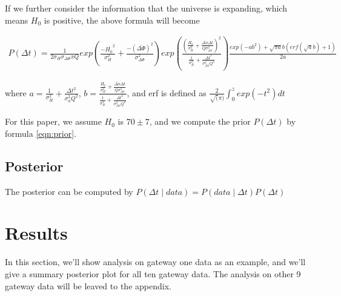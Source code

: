 \documentclass[\docopts]{\docclass}
\begin{document}
If we further consider the information that the universe is expanding, which means $H_0$ is positive, the above formula will become

\begin{align}
\label{eqn:prior}
P(\Delta t) = \frac{1}{2\sigma_{H}\sigma_{\Delta \Phi}\pi Q} exp(\frac{-\bar{H_0}^2}{\sigma_H^2}+\frac{-(\bar{\Delta \Phi})^2}{\sigma_{\Delta \Phi}^2})
exp(\frac{(\frac{\bar{H_0}}{\sigma_H^2}+\frac{\bar{\Delta \phi}\Delta t}{Q\sigma_{\Delta \phi}^2})^2}{\frac{1}{\sigma_H^2}+\frac{\Delta t^2}{\sigma_{\Delta \phi}^2 Q^2}}) \frac{exp(-ab^2)+\sqrt{\pi a}b(erf(\sqrt{a}b)+1)}{2a}
\end{align}

 where $a=\frac{1}{\sigma_H^2}+\frac{\Delta t^2}{\sigma_\phi^2Q^2}$, $b=\frac{\frac{\bar{H_0}}{\sigma_H^2}+\frac{\bar{\Delta \phi}\Delta t}{Q\sigma_{\Delta \phi}^2}}{\frac{1}{\sigma_H^2}+\frac{\Delta t^2}{\sigma_{\Delta\phi}^2 Q^2}}$, and erf is defined as $\frac{2}{\sqrt(\pi)}\int_0^z exp(-t^2) dt$

For this paper, we assume $H_0$ is $70 \pm 7$, and we compute the prior $P(\Delta t)$ by formula \ref{eqn:prior}.

\subsection{Posterior}
The posterior can be computed by
$P(\Delta t \mid data) = P(data \mid \Delta t) P(\Delta t)$

\section{Results}
\label{sec:results}
In this section, we'll show analysis on gateway one data as an example, and we'll give a summary posterior plot for all ten gateway data. The analysis on other 9 gateway data  will be leaved to the appendix.
\end{document}

